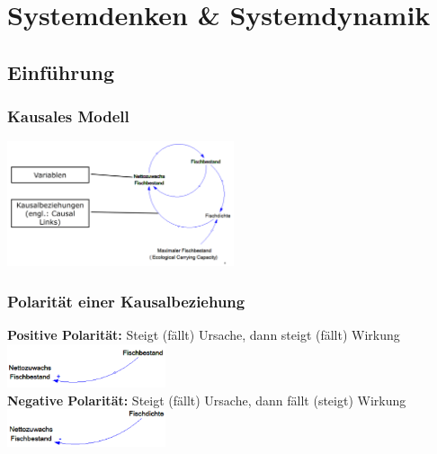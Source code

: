 \section{Systemdenken \& Systemdynamik}
\subsection{Einführung}
\begin{multicols}{2}
	\subsubsection{Kausales Modell}
	\includegraphics[width=0.5\textwidth]{pictures/kausales_modell}

	\subsubsection{Polarität einer Kausalbeziehung}
	\textbf{Positive Polarität:} Steigt (fällt) Ursache, dann steigt (fällt) Wirkung \\
	\includegraphics[width=0.35\textwidth]{pictures/positive_polaritaet}\\
	\textbf{Negative Polarität:} Steigt (fällt) Ursache, dann fällt (steigt) Wirkung \\
	\includegraphics[width=0.35\textwidth]{pictures/negative_polaritaet}
\end{multicols}

